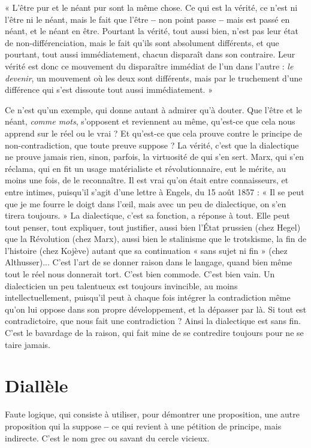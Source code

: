 \vspace{0.5cm}
{\footnotesize
« L’être pur et le néant pur sont la même chose. Ce qui est la vérité, ce n’est ni l'être
ni le néant, mais le fait que l'être {\bf --} non point passe {\bf --} mais est passé en néant, et le
néant en être. Pourtant la vérité, tout aussi bien, n’est pas leur état de non-différenciation,
mais le fait qu’ils sont absolument différents, et que pourtant, tout aussi immédiatement,
chacun disparaît dans son contraire. Leur vérité est donc ce mouvement du disparaître
immédiat de l’un dans l’autre : {\it le devenir}, un mouvement où les deux sont
différents, mais par le truchement d’une différence qui s’est dissoute tout aussi
immédiatement. »
}
\vspace{0.5cm}

Ce n’est qu’un exemple, qui donne autant à admirer qu’à douter. Que
l'être et le néant, {\it comme mots}, s'opposent et reviennent au même, qu'est-ce
que cela nous apprend sur le réel ou le vrai ? Et qu'est-ce que cela prouve
contre le principe de non-contradiction, que toute preuve suppose ? La
vérité, c’est que la dialectique ne prouve jamais rien, sinon, parfois, la virtuosité
de qui s’en sert. Marx, qui s’en réclama, qui en fit un usage matérialiste
et révolutionnaire, eut le mérite, au moins une fois, de le reconnaître. Il est
vrai qu'on était entre connaisseurs, et entre intimes, puisqu'il s’agit d’une
lettre à Engels, du 15 août 1857 : « Il se peut que je me fourre le doigt dans
l'œil, mais avec un peu de dialectique, on s’en tirera toujours. » La dialectique,
c’est sa fonction, a réponse à tout. Elle peut tout penser, tout expliquer,
tout justifier, aussi bien l’État prussien (chez Hegel) que la Révolution
(chez Marx), aussi bien le stalinisme que le trotskisme, la fin de l’histoire
(chez Kojève) autant que sa continuation « sans sujet ni fin » (chez
Althusser)... C’est l’art de se donner raison dans le langage, quand bien
même tout le réel nous donnerait tort. C’est bien commode. C’est bien vain.
Un dialecticien un peu talentueux est toujours invincible, au moins intellectuellement,
puisqu'il peut à chaque fois intégrer la contradiction même
qu’on lui oppose dans son propre développement, et la dépasser par là. Si
tout est contradictoire, que nous fait une contradiction ? Ainsi la dialectique
est sans fin. C’est le bavardage de la raison, qui fait mine de se contredire toujours
pour ne se taire jamais.

\section{Diallèle}
Faute logique, qui consiste à utiliser, pour démontrer une proposition,
une autre proposition qui la suppose {\bf --} ce qui revient
à une pétition de principe, mais indirecte. C’est le nom grec ou savant du cercle
vicieux.

